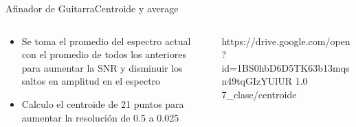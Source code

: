 \begin{frame}[t]{Afinador de Guitarra}{Centroide y average}
   \footnotesize
   \begin{columns}
      \begin{column}{.5\textwidth}
         \begin{itemize}
            \item{Se toma el promedio del espectro actual con el promedio de todos los anteriores para aumentar la SNR y disminuir los saltos en amplitud en el espectro}
            \item{Calculo el centroide de 21 puntos para aumentar la resolución de 0.5 a 0.025}
         \end{itemize}
      
      
      \end{column}
      \begin{column}{.5\textwidth}
         {https://drive.google.com/open?id=1BS0hbD6D5TK63b13mqsn49tqGIzYUlUR}
         {1.0}
         {7_clase/centroide}
      \end{column}
   \end{columns}
   \vfill
   \note{
      \begin{itemize}
         \item{}
         \item{}
      \end{itemize}
   }
\end{frame}
